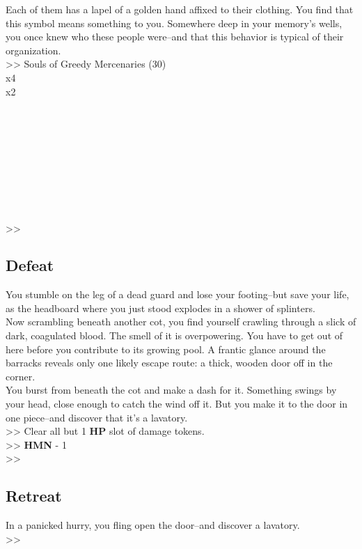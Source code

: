 Each of them has a lapel of a golden hand affixed to their clothing. You find that this symbol means something to you. Somewhere deep in your memory’s wells, you once knew who these people were--and that this behavior is typical of their organization.\\

>> Souls of Greedy Mercenaries (30)\\
 x4\\
 x2\\
\\
\\
\\
\\
\\
\\
\\
\\
\\
>> 

\subsection*{Defeat}
You stumble on the leg of a dead guard and lose your footing--but save your life, as the headboard where you just stood explodes in a shower of splinters.\\

Now scrambling beneath another cot, you find yourself crawling through a slick of dark, coagulated blood. The smell of it is overpowering. You have to get out of here before you contribute to its growing pool. A frantic glance around the barracks reveals only one likely escape route: a thick, wooden door off in the corner.\\

You burst from beneath the cot and make a dash for it. Something swings by your head, close enough to catch the wind off it. But you make it to the door in one piece--and discover that it’s a lavatory.\\

>> Clear all but 1 \textbf{HP} slot of damage tokens.\\
>> \textbf{HMN} - 1\\
>> 

\subsection*{Retreat}
In a panicked hurry, you fling open the door--and discover a lavatory.\\

>> 